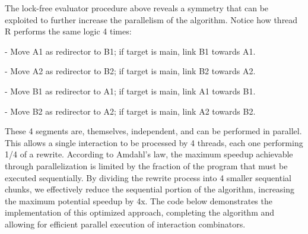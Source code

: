 \documentclass{article}
\begin{document}
The lock-free evaluator procedure above reveals a symmetry that can be exploited to further increase the parallelism of the algorithm. Notice how thread R performs the same logic 4 times:

- Move A1 as redirector to B1; if target is main, link B1 towards A1.

- Move A2 as redirector to B2; if target is main, link B2 towards A2.

- Move B1 as redirector to A1; if target is main, link A1 towards B1.

- Move B2 as redirector to A2; if target is main, link A2 towards B2.

These 4 segments are, themselves, independent, and can be performed in parallel. This allows a single interaction to be processed by 4 threads, each one performing 1/4 of a rewrite. According to Amdahl's law, the maximum speedup achievable through parallelization is limited by the fraction of the program that must be executed sequentially. By dividing the rewrite process into 4 smaller sequential chunks, we effectively reduce the sequential portion of the algorithm, increasing the maximum potential speedup by 4x. The code below demonstrates the implementation of this optimized approach, completing the algorithm and allowing for efficient parallel execution of interaction combinators.
\end{document}
